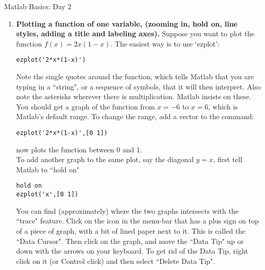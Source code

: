 \documentclass[12pt]{report}
\begin{document}
\centerline{Matlab Basics: Day 2}
\begin{enumerate}
\centerline{\it EDGE 2019}
\item {\bf Plotting a function of one variable, (zooming in, hold on, line styles, adding a title and labeling axes).}
Suppose you want to plot the function $f(x) = 2x ( 1 - x)$.  The easiest way is to use `ezplot':
\begin{verbatim}
ezplot('2*x*(1-x)')
\end{verbatim}
Note the single quotes around the function, which tells Matlab that you are typing in a ``string", or a sequence of symbols, that it will then interpret.  Also note the asterisks wherever there is multiplication.  Matlab insists on these.  \\
You should get a graph of the function from $x = -6$ to $x = 6$, which is Matlab's default range.  To change the range, add a vector to the command:
\begin{verbatim}
ezplot('2*x*(1-x)',[0 1])
\end{verbatim}
now plots the function between 0 and 1. \\
To add another graph to the same plot, say the diagonal $y = x$, first tell Matlab to ``hold on"
\begin{verbatim}
hold on
ezplot('x',[0 1])
\end{verbatim}
You can find (approximately) where the two graphs intersects with the ``trace" feature.  Click on the icon in the menu-bar that has a plus sign on top of a piece of graph, with a bit of lined paper next to it.   This is called the ``Data Cursor".  Then click on the graph, and move the ``Data Tip" up or down with the arrows on your keyboard.  To get rid of the Data Tip, right click on it (or Control click) and then select ``Delete Data Tip".


\end{enumerate}
\end{document}
